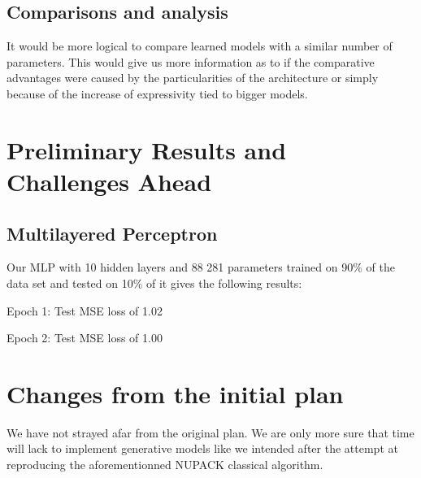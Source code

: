 \documentclass{article}
\begin{document}
\subsection{Comparisons and analysis}
It would be more logical to compare learned models with a similar 
number of parameters. This would give us more information as 
to if the comparative advantages were caused by the particularities 
of the architecture or simply because of the increase of expressivity 
tied to bigger models.

\section{Preliminary Results and Challenges Ahead}

\subsection{Multilayered Perceptron}
Our MLP with 10 hidden layers and 88 281 parameters trained on 90\% of the data set and tested on 10\% of it gives the following results:

Epoch 1: Test MSE loss of 1.02

Epoch 2: Test MSE loss of 1.00
\section{Changes from the initial plan}
We have not strayed afar from the original plan. We 
are only more sure that time will lack to implement 
generative models like we intended after the attempt at reproducing
the aforementionned NUPACK classical algorithm.



\end{document}
